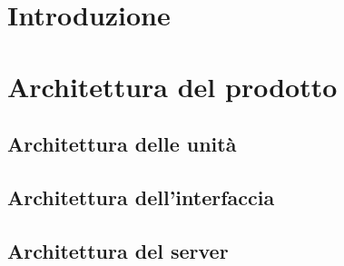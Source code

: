 \documentclass[]{article}
\begin{document}
	
	\newpage
	\tableofcontents
	\newpage
	\listoffigures
	\listoftables
	\newpage

	\section{Introduzione}
	
	\newpage

	\section{Architettura del prodotto}
	
	\subsection{Architettura delle unità}
	
	\newpage
	
	\subsection{Architettura dell'interfaccia}
	
	\newpage
	
	\subsection{Architettura del server}
	
	\newpage
\end{document}
